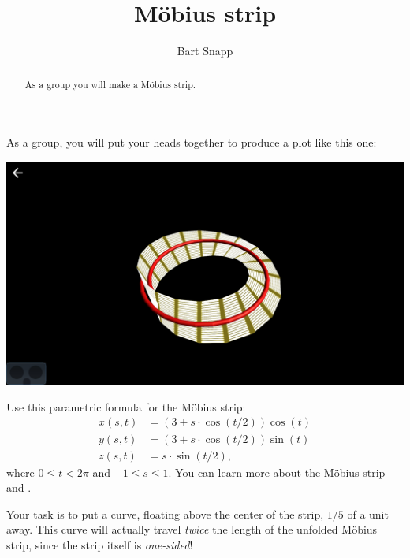 \documentclass{ximera}
\author{Bart Snapp}
\title{M\"obius strip}
\begin{document}
\begin{abstract}
  As a group you will make a M\"obius strip.
\end{abstract}
\maketitle

As a group, you will put your heads together to produce a plot like this one:
\begin{image}
  \includegraphics{mobius.png}
\end{image}

Use this parametric formula for the M\"obius strip:
\begin{align*}
  x(s,t) &= (3+s\cdot \cos(t/2))\cos(t)\\
  y(s,t) &=(3+s\cdot \cos(t/2))\sin(t)\\
  z(s,t) &=s\cdot \sin(t/2),
\end{align*}
where $0\le t<2\pi$ and $-1\le s\le 1$. You can learn more about the
M\"obius strip  and .

Your task is to put a curve, floating above the center of the strip,
$1/5$ of a unit away. This curve will actually travel \textit{twice}
the length of the unfolded M\"obius strip, since the strip itself is
\textit{one-sided}!
\end{document}
